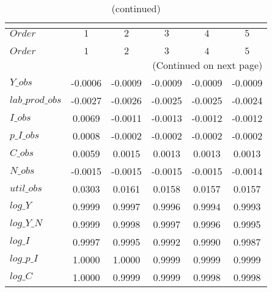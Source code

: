  
\begin{center}
\begin{longtable}{lccccc} 
\caption{COEFFICIENTS OF AUTOCORRELATION}\\
 \label{Table:th_autocorr_matrix}\\
\toprule 
$Order           $	 & 	 $          1$	 & 	 $          2$	 & 	 $          3$	 & 	 $          4$	 & 	 $          5$\\
\midrule \endfirsthead 
\caption{(continued)}\\
 \toprule \\ 
$Order           $	 & 	 $          1$	 & 	 $          2$	 & 	 $          3$	 & 	 $          4$	 & 	 $          5$\\
\midrule \endhead 
\midrule \multicolumn{6}{r}{(Continued on next page)} \\ \bottomrule \endfoot 
\bottomrule \endlastfoot 
$Y\_obs          $	 & 	    -0.0006	 & 	    -0.0009	 & 	    -0.0009	 & 	    -0.0009	 & 	    -0.0009 \\ 
$lab\_prod\_obs  $	 & 	    -0.0027	 & 	    -0.0026	 & 	    -0.0025	 & 	    -0.0025	 & 	    -0.0024 \\ 
$I\_obs          $	 & 	     0.0069	 & 	    -0.0011	 & 	    -0.0013	 & 	    -0.0012	 & 	    -0.0012 \\ 
$p\_I\_obs       $	 & 	     0.0008	 & 	    -0.0002	 & 	    -0.0002	 & 	    -0.0002	 & 	    -0.0002 \\ 
$C\_obs          $	 & 	     0.0059	 & 	     0.0015	 & 	     0.0013	 & 	     0.0013	 & 	     0.0013 \\ 
$N\_obs          $	 & 	    -0.0015	 & 	    -0.0015	 & 	    -0.0015	 & 	    -0.0015	 & 	    -0.0014 \\ 
$util\_obs       $	 & 	     0.0303	 & 	     0.0161	 & 	     0.0158	 & 	     0.0157	 & 	     0.0157 \\ 
$log\_Y          $	 & 	     0.9999	 & 	     0.9997	 & 	     0.9996	 & 	     0.9994	 & 	     0.9993 \\ 
$log\_Y\_N       $	 & 	     0.9999	 & 	     0.9998	 & 	     0.9997	 & 	     0.9996	 & 	     0.9995 \\ 
$log\_I          $	 & 	     0.9997	 & 	     0.9995	 & 	     0.9992	 & 	     0.9990	 & 	     0.9987 \\ 
$log\_p\_I       $	 & 	     1.0000	 & 	     1.0000	 & 	     0.9999	 & 	     0.9999	 & 	     0.9999 \\ 
$log\_C          $	 & 	     1.0000	 & 	     0.9999	 & 	     0.9999	 & 	     0.9998	 & 	     0.9998 \\ 

\end{longtable}
\end{center}
